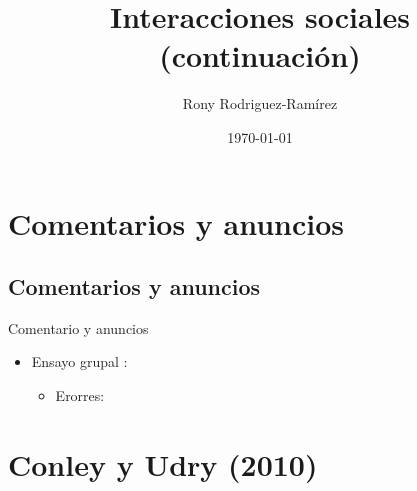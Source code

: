\documentclass[11pt, aspectratio=169, compress]{beamer}
\title{Interacciones sociales (continuación)}
\author{Rony Rodriguez-Ramírez}
\institute{Economía Social y Humana | Grupo B018 \\Universidad Centroamericana}
\date{\today}
\begin{document}
	
\begin{frame}[plain]
	\maketitle  
\end{frame}

\section{Comentarios y anuncios}
\subsection{Comentarios y anuncios}
\begin{frame}{Comentario y anuncios}
\begin{itemize}
	\item Ensayo grupal :
	\begin{itemize}
		\item Erorres: 
	\end{itemize}
\end{itemize}
\end{frame}
\section{Conley y Udry (2010)}
\end{document}
